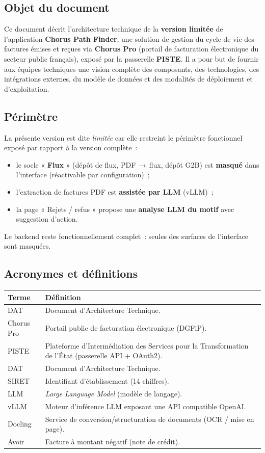 \documentclass[11pt,a4paper]{article}
\begin{document}
\subsection{Objet du document}
Ce document décrit l'architecture technique de la \textbf{version limitée} de
l'application \textbf{Chorus Path Finder}, une solution de gestion du cycle de
vie des factures émises et reçues via \textbf{Chorus Pro} (portail de
facturation électronique du secteur public français), exposé par la passerelle
\textbf{PISTE}. Il a pour but de fournir aux équipes techniques une vision
complète des composants, des technologies, des intégrations externes, du
modèle de données et des modalités de déploiement et d'exploitation.

\subsection{Périmètre}
La présente version est dite \emph{limitée} car elle restreint le périmètre
fonctionnel exposé par rapport à la version complète~:
\begin{itemize}[nosep]
  \item le socle « \textbf{Flux} » (dépôt de flux, PDF\,$\rightarrow$\,flux, dépôt G2B) est
        \textbf{masqué} dans l'interface (réactivable par configuration)~;
  \item l'extraction de factures PDF est \textbf{assistée par LLM} (vLLM)~;
  \item la page « Rejets / refus » propose une \textbf{analyse LLM du motif} avec
        suggestion d'action.
\end{itemize}
Le backend reste fonctionnellement complet~: seules des surfaces de l'interface
sont masquées.

\subsection{Acronymes et définitions}
\begin{longtable}{p{2.6cm} p{12.5cm}}
\toprule
\textbf{Terme} & \textbf{Définition} \\
\midrule
\endhead
DAT & Document d'Architecture Technique. \\
Chorus Pro & Portail public de facturation électronique (DGFiP). \\
PISTE & Plateforme d'Intermédiation des Services pour la Transformation de l'État (passerelle API + OAuth2). \\
DAT & Document d'Architecture Technique. \\
SIRET & Identifiant d'établissement (14 chiffres). \\
LLM & \emph{Large Language Model} (modèle de langage). \\
vLLM & Moteur d'inférence LLM exposant une API compatible OpenAI. \\
Docling & Service de conversion/structuration de documents (OCR / mise en page). \\
Avoir & Facture à montant négatif (note de crédit). \\
\bottomrule
\end{longtable}
\end{document}
